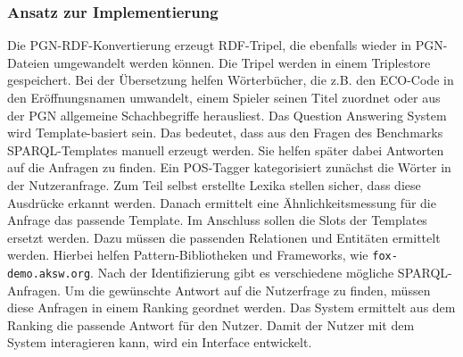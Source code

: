 \documentclass[12pt]{scrreprt}
\begin{document}
\subsubsection*{Ansatz zur Implementierung}
Die PGN-RDF-Konvertierung erzeugt RDF-Tripel, die ebenfalls wieder in PGN-Dateien umgewandelt werden können. Die Tripel werden in einem Triplestore gespeichert. Bei der Übersetzung helfen Wörterbücher, die z.B. den ECO-Code in den Eröffnungsnamen umwandelt, einem Spieler seinen Titel zuordnet oder aus der PGN allgemeine Schachbegriffe herausliest.\newline
Das Question Answering System wird Template-basiert sein. Das bedeutet, dass aus den Fragen des Benchmarks SPARQL-Templates manuell erzeugt werden. Sie helfen später dabei Antworten auf die Anfragen zu finden.\newline
Ein POS-Tagger kategorisiert zunächst die Wörter in der Nutzeranfrage. Zum Teil selbst erstellte Lexika stellen sicher, dass diese Ausdrücke erkannt werden. Danach ermittelt eine Ähnlichkeitsmessung für die Anfrage das passende Template.\newline
Im Anschluss sollen die Slots der Templates ersetzt werden. Dazu müssen die passenden Relationen und Entitäten ermittelt werden. Hierbei helfen Pattern-Bibliotheken und Frameworks, wie \texttt{fox-demo.aksw.org}.
Nach der Identifizierung gibt es verschiedene mögliche SPARQL-Anfragen. Um die gewünschte Antwort auf die Nutzerfrage zu finden, müssen diese Anfragen in einem Ranking geordnet werden. Das System ermittelt aus dem Ranking die passende Antwort für den Nutzer.\newline
Damit der Nutzer mit dem System interagieren kann, wird ein Interface entwickelt.
	
\end{document}
